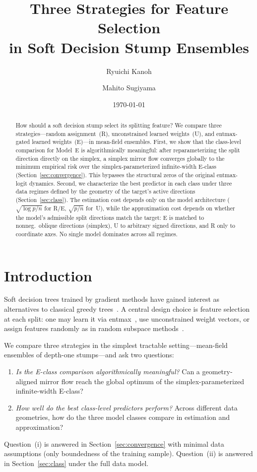 \documentclass[11pt,a4paper]{article}
\title{%
  Three Strategies for Feature Selection\\
  in Soft Decision Stump Ensembles
}
\author{
  Ryuichi Kanoh \and Mahito Sugiyama
}
\date{\today}
\theoremstyle{definition}
\theoremstyle{remark}
\begin{document}
\maketitle

\begin{abstract}
How should a soft decision stump select its
splitting feature?
We compare three strategies---random
assignment~(R), unconstrained learned
weights~(U), and entmax-gated learned
weights~(E)---in mean-field ensembles.
First, we show that the class-level
comparison for Model~E is algorithmically
meaningful: after reparameterizing the split
direction directly on the simplex, a
simplex mirror flow converges globally to
the minimum empirical risk over the
simplex-parameterized infinite-width E-class
(Section~\ref{sec:convergence}).
This bypasses the structural zeros of the
original entmax-logit dynamics.
Second, we characterize the best predictor in
each class under three data regimes
defined by the geometry of the target's
active directions
(Section~\ref{sec:class}).
The estimation cost depends only on the
model architecture ($\sqrt{\log p/n}$
for R/E, $\sqrt{p/n}$ for~U), while
the approximation cost depends on
whether the model's admissible split
directions match the target:
E is matched to nonneg.\ oblique
directions (simplex), U to arbitrary
signed directions, and R only to
coordinate axes.
No single model dominates across all regimes.
\end{abstract}

\section{Introduction}
\label{sec:intro}

Soft decision trees trained by gradient methods
have gained interest as alternatives to classical
greedy trees~\citep{frosst2017distilling,
hazimeh2020tree,popov2020neural}.
A central design choice is feature selection at
each split: one may learn it via
entmax~\citep{peters2019sparse,blondel2020learning},
use unconstrained weight vectors, or assign features
randomly as in random subspace
methods~\citep{ho1998random}.

We compare three strategies in the simplest
tractable setting---mean-field ensembles of
depth-one stumps---and ask two questions:
\begin{enumerate}[label=(\roman*),nosep]
  \item \emph{Is the E-class comparison
  algorithmically meaningful?}\;
  Can a geometry-aligned mirror flow reach
  the global optimum of the
  simplex-parameterized infinite-width
  E-class?
  \item \emph{How well do the best class-level
  predictors perform?}\;
  Across different data geometries, how do the
  three model classes compare in estimation and
  approximation?
\end{enumerate}
Question~(i) is answered in
Section~\ref{sec:convergence} with minimal
data assumptions (only boundedness of the
training sample).
Question~(ii) is answered in
Section~\ref{sec:class} under the full
data model.
\end{document}
